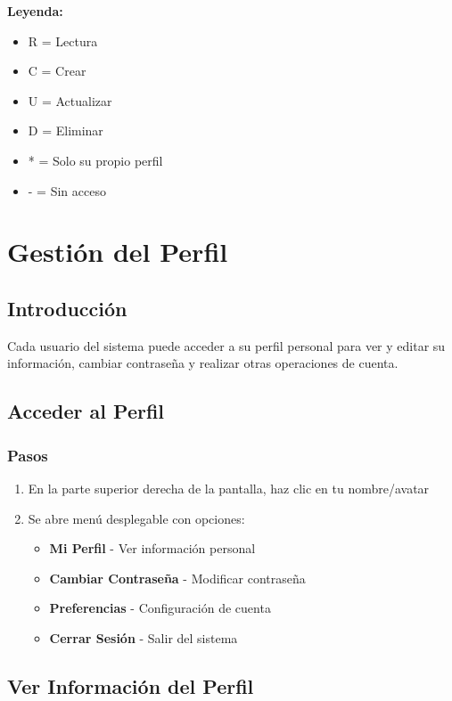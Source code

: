\documentclass[12pt,a4paper,spanish,oneside]{report}
\begin{document}
\textbf{Leyenda:}
\begin{itemize}
    \item R = Lectura
    \item C = Crear
    \item U = Actualizar
    \item D = Eliminar
    \item * = Solo su propio perfil
    \item - = Sin acceso
\end{itemize}

\chapter{Gestión del Perfil}

\section{Introducción}

Cada usuario del sistema puede acceder a su perfil personal para ver y editar su información, cambiar contraseña y realizar otras operaciones de cuenta.

\section{Acceder al Perfil}

\subsection{Pasos}

\begin{enumerate}
\item En la parte superior derecha de la pantalla, haz clic en tu nombre/avatar
\item Se abre menú desplegable con opciones:
\begin{itemize}
\item \textbf{Mi Perfil} - Ver información personal
\item \textbf{Cambiar Contraseña} - Modificar contraseña
\item \textbf{Preferencias} - Configuración de cuenta
\item \textbf{Cerrar Sesión} - Salir del sistema
\end{itemize}
\end{enumerate}

\section{Ver Información del Perfil}
\end{document}
